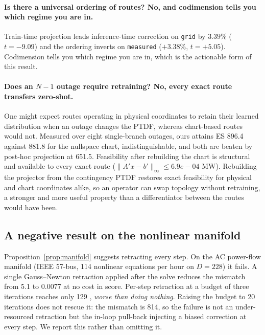 \documentclass{article}
\newcommand{\dataset}[1]{\texttt{#1}}
\begin{document}
\paragraph{Is there a universal ordering of routes? No, and codimension tells you which regime you are in.} Train-time projection leads inference-time correction on \dataset{grid} by $3.39\%$ ($t=-9.09$) and the ordering inverts on \dataset{measured} ($+3.38\%$, $t=+5.05$). Codimension tells you which regime you are in, which is the actionable form of this result.

\paragraph{Does an $N-1$ outage require retraining? No, every exact route transfers zero-shot.} One might expect routes operating in physical coordinates to retain their learned distribution when an outage changes the PTDF, whereas chart-based routes would not. Measured over eight single-branch outages, ours attains ES 896.4 against 881.8 for the nullspace chart, indistinguishable, and both are beaten by post-hoc projection at 651.5. Feasibility after rebuilding the chart is structural and available to every exact route ($\|A'x-b'\|_\infty \le 6.9e-04$ MW). Rebuilding the projector from the contingency PTDF restores exact feasibility for physical and chart coordinates alike, so an operator can swap topology without retraining, a stronger and more useful property than a differentiator between the routes would have been.

\subsection{A negative result on the nonlinear manifold}\label{sec:ac}
Proposition~\ref{prop:manifold} suggests retracting every step. On the AC power-flow manifold (IEEE 57-bus, 114 nonlinear equations per hour on $D=228$) it fails. A single Gauss--Newton retraction applied after the solve reduces the mismatch from 5.1 to 0.0077 at no cost in score. Per-step retraction at a budget of three iterations reaches only 129 ,  \emph{worse than doing nothing}.
 Raising the budget to 20 iterations does not rescue it: the mismatch is 814, so the failure is not an under-resourced retraction but the in-loop pull-back injecting a biased correction at every step. We report this rather than omitting it.
\end{document}
